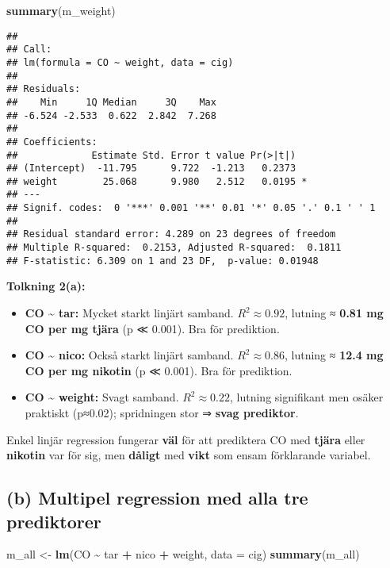 \documentclass[
  11pt,
]{article}
\newenvironment{Shaded}{\begin{snugshade}}{\end{snugshade}}
\newcommand{\AttributeTok}[1]{\textcolor[rgb]{0.13,0.29,0.53}{#1}}
\newcommand{\FunctionTok}[1]{\textcolor[rgb]{0.13,0.29,0.53}{\textbf{#1}}}
\newcommand{\NormalTok}[1]{#1}
\newcommand{\OtherTok}[1]{\textcolor[rgb]{0.56,0.35,0.01}{#1}}
\newcommand{\SpecialCharTok}[1]{\textcolor[rgb]{0.81,0.36,0.00}{\textbf{#1}}}
\providecommand{\tightlist}{%
  \setlength{\itemsep}{0pt}\setlength{\parskip}{0pt}}
\begin{document}
\begin{Shaded}
\begin{Highlighting}[]
\FunctionTok{summary}\NormalTok{(m\_weight)}
\end{Highlighting}
\end{Shaded}

\begin{verbatim}
## 
## Call:
## lm(formula = CO ~ weight, data = cig)
## 
## Residuals:
##    Min     1Q Median     3Q    Max 
## -6.524 -2.533  0.622  2.842  7.268 
## 
## Coefficients:
##             Estimate Std. Error t value Pr(>|t|)  
## (Intercept)  -11.795      9.722  -1.213   0.2373  
## weight        25.068      9.980   2.512   0.0195 *
## ---
## Signif. codes:  0 '***' 0.001 '**' 0.01 '*' 0.05 '.' 0.1 ' ' 1
## 
## Residual standard error: 4.289 on 23 degrees of freedom
## Multiple R-squared:  0.2153, Adjusted R-squared:  0.1811 
## F-statistic: 6.309 on 1 and 23 DF,  p-value: 0.01948
\end{verbatim}

\textbf{Tolkning 2(a):}

\begin{itemize}
\tightlist
\item
  \textbf{CO \textasciitilde{} tar:} Mycket starkt linjärt samband.
  \(R^2 \approx 0.92\), lutning ≈ \textbf{0.81 mg CO per mg tjära} (p ≪
  0.001). Bra för prediktion.
\item
  \textbf{CO \textasciitilde{} nico:} Också starkt linjärt samband.
  \(R^2 \approx 0.86\), lutning ≈ \textbf{12.4 mg CO per mg nikotin} (p
  ≪ 0.001). Bra för prediktion.
\item
  \textbf{CO \textasciitilde{} weight:} Svagt samband.
  \(R^2 \approx 0.22\), lutning signifikant men osäker praktiskt
  (p≈0.02); spridningen stor ⇒ \textbf{svag prediktor}.
\end{itemize}

Enkel linjär regression fungerar \textbf{väl} för att prediktera CO med
\textbf{tjära} eller \textbf{nikotin} var för sig, men \textbf{dåligt}
med \textbf{vikt} som ensam förklarande variabel.

\subsection{(b) Multipel regression med alla tre
prediktorer}\label{b-multipel-regression-med-alla-tre-prediktorer}

\begin{Shaded}
\begin{Highlighting}[]
\NormalTok{m\_all }\OtherTok{\textless{}{-}} \FunctionTok{lm}\NormalTok{(CO }\SpecialCharTok{\textasciitilde{}}\NormalTok{ tar }\SpecialCharTok{+}\NormalTok{ nico }\SpecialCharTok{+}\NormalTok{ weight, }\AttributeTok{data =}\NormalTok{ cig)}
\FunctionTok{summary}\NormalTok{(m\_all)}
\end{Highlighting}
\end{Shaded}
\end{document}
